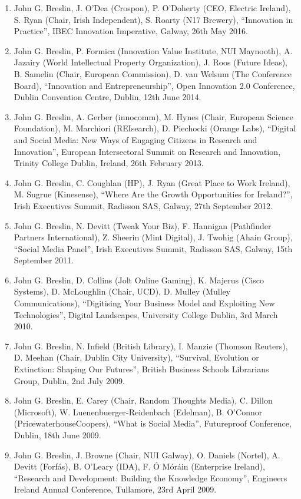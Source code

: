 \documentclass[10pt,a4paper]{res} %
\begin{document}
\begin{resume}
\begin{enumerate}
\item John G. Breslin, J. O'Dea (Crospon), P. O'Doherty (CEO, Electric Ireland), S. Ryan (Chair, Irish Independent), S. Roarty (N17 Brewery), ``Innovation in Practice'', IBEC Innovation Imperative, Galway, 26th May 2016.
\item John G. Breslin, P. Formica (Innovation Value Institute, NUI Maynooth), A. Jazairy (World Intellectual Property Organization), J. Roos (Future Ideas), B. Samelin (Chair, European Commission), D. van Welsum (The Conference Board), ``Innovation and Entrepreneurship'', Open Innovation 2.0 Conference, Dublin Convention Centre, Dublin, 12th June 2014.
\item John G. Breslin, A. Gerber (innocomm), M. Hynes (Chair, European Science Foundation), M. Marchiori (REIsearch), D. Piechocki (Orange Labs), ``Digital and Social Media: New Ways of Engaging Citizens in Research and Innovation'', European Intersectoral Summit on Research and Innovation, Trinity College Dublin, Ireland, 26th February 2013.
\item John G. Breslin, C. Coughlan (HP), J. Ryan (Great Place to Work Ireland), M. Sugrue (Kinesense), ``Where Are the Growth Opportunities for Ireland?'', Irish Executives Summit, Radisson SAS, Galway, 27th September 2012.
\item John G. Breslin, N. Devitt (Tweak Your Biz), F. Hannigan (Pathfinder Partners International), Z. Sheerin (Mint Digital), J. Twohig (Ahain Group), ``Social Media Panel'', Irish Executives Summit, Radisson SAS, Galway, 15th September 2011.
\item John G. Breslin, D. Collins (Jolt Online Gaming), K. Majerus (Cisco Systems), D. McLoughlin (Chair, UCD), D. Mulley (Mulley Communications), ``Digitising Your Business Model and Exploiting New Technologies'', Digital Landscapes, University College Dublin, 3rd March 2010.
\item John G. Breslin, N. Infield (British Library), I. Manzie (Thomson Reuters), D. Meehan (Chair, Dublin City University), ``Survival, Evolution or Extinction: Shaping Our Futures'', British Business Schools Librarians Group, Dublin, 2nd July 2009.
\item John G. Breslin, E. Carey (Chair, Random Thoughts Media), C. Dillon (Microsoft), W. Luenenbuerger-Reidenbach (Edelman), B. O'Connor (PricewaterhouseCoopers), ``What is Social Media'', Futureproof Conference, Dublin, 18th June 2009.
\item John G. Breslin, J. Browne (Chair, NUI Galway), O. Daniels (Nortel), A. Devitt (Forf\'{a}s), B. O'Leary (IDA), F. \'{O} M\'{o}r\'{a}in (Enterprise Ireland), ``Research and Development: Building the Knowledge Economy'', Engineers Ireland Annual Conference, Tullamore, 23rd April 2009.

\end{enumerate}
\end{resume}
\end{document}
